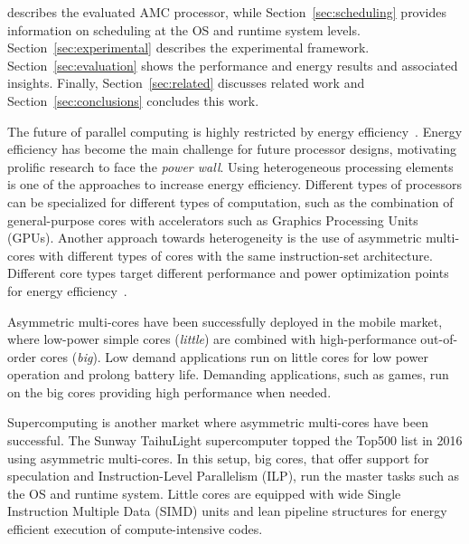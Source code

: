 describes the evaluated AMC processor, while Section~\ref{sec:scheduling} provides information on 
scheduling at the OS and runtime system levels. 
Section~\ref{sec:experimental} describes the experimental framework. 
Section~\ref{sec:evaluation} shows the performance and energy results and associated insights.%
Finally, Section~\ref{sec:related} discusses related work and Section~\ref{sec:conclusions} concludes this work. 





\iffalse

The future of parallel computing is highly restricted by energy 
efficiency~\cite{Kogge_Exascale_TR08}. Energy efficiency has become the main 
challenge for future processor designs, motivating prolific research to face the 
\emph{power wall}. Using heterogeneous processing elements is one of the 
approaches to increase energy efficiency. Different types of processors can 
be specialized for different types of computation, such as the combination of 
general-purpose cores with accelerators such as Graphics Processing Units (GPUs). 
Another approach towards heterogeneity is the use of asymmetric multi-cores 
with different types of cores with the same instruction-set architecture. Different core types 
target different performance and power optimization points for energy
efficiency~\cite{Kumar:ISCA2004,Balakrishnan:ISCA2005}. 

Asymmetric multi-cores have been successfully deployed in the mobile market, where 
low-power simple cores (\emph{little}) are combined with 
high-performance out-of-order cores (\emph{big}). Low demand applications
run on little cores for low power operation and prolong battery life. Demanding
applications, such as games, run on the big cores providing high performance
when needed.

Supercomputing is another market where asymmetric multi-cores have been successful. 
The Sunway TaihuLight supercomputer topped the Top500 list in 2016 using asymmetric multi-cores. 
In this setup, big cores, that offer support for speculation and Instruction-Level Parallelism (ILP), run the master tasks such as the OS and runtime system.
Little cores are equipped with wide Single Instruction Multiple Data (SIMD) units and lean pipeline structures for energy efficient execution of compute-intensive codes. 

